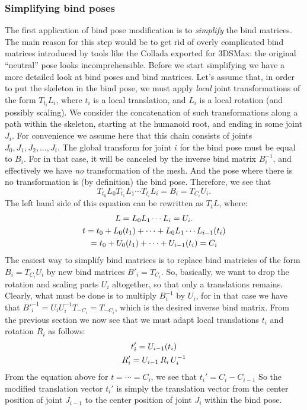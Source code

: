 \subsubsection{Simplifying bind poses}

The first application of bind pose modification is to \emph{simplify} the bind matrices.
The main reason for this step would be to get rid of overly complicated bind matrices introduced
by tools like the Collada exported for 3DSMax: the original ``neutral'' pose looks incomprehensible.
Before we start simplifying we have a more detailed look at bind poses and bind matrices.
Let's assume that, in order to put the skeleton in the bind pose, we must apply
\emph{local} joint transformations of the form $T_{t_i} L_i$, where $t_i$ is a local translation, and $L_i$ is a local
rotation (and possibly scaling).
We consider the concatenation of such transformations along a path within the skeleton, starting at
the humanoid root, and ending in some joint $J_i$.
For convenience we assume here that this chain consists of joints $J_0, J_1, J_2, \ldots, J_i$.
The  global transform for  joint $i$ for the bind pose  must be equal to $B_i$.
For in that case, it will be canceled by the inverse bind matrix $B_i^{-1}$, and effectively we have \emph{no}
transformation of the mesh. And the pose where there is no transformation is (by definition) the bind pose.
 Therefore, we see that
 \[ T_{t_0} L_0 T_{t_1} L_1 \cdots T_{t_i} L_i = B_i = T_{C_i} U_i.\]
%
The left hand side of this equation can be rewritten as $T_t L$, where:
\begin{gather}
 L = L_0 L_1\cdots L_i = U_i. \notag \\
 t = t_0 + L_0(t_1) + \cdots + L_0 L_1\cdots L_{i-1}(t_i) \notag\\
  = t_0 + U_0(t_1) + \cdots + U_{i-1}(t_i) = C_i \notag
\end{gather}
%
The easiest way to simplify bind matrices is
to replace bind matricies of the form $B_i = T_{C_i} U_i$ by  new
bind matrices ${B'}_i = T_{C_i}$. So, basically, we want to drop the rotation and scaling parts $U_i$ altogether,
so that only a translations remains.
Clearly, what must be done is to multiply $B_i^{-1}$ by $U_i$, for in that case we have that
${B'}_i^{-1} = U_i U_i^{-1} T_{-C_i} = T_{-C_i}$, which is the desired inverse bind matrix.
From the previous section we now see that we must adapt local translations $t_i$ and rotation $R_i$
as follows:
\begin{gather}
t_i'= U_{i-1}(t_i)\notag\\
R_i' = U_{i-1}\,R_i\,U_i^{-1}\notag
\end{gather}
%
From the equation above for $t = \cdots = C_i$, we see that $t_i' = C_i - C_{i-1}$
So the modified translation vector $t_i'$ is simply the translation vector from the center position
of joint $J_{i-1}$ to the center position of joint $J_i$ within the bind pose.


